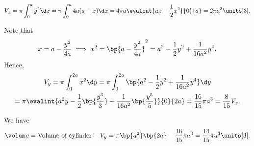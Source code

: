 \begin{solution}
    \[V_x = \pi \int_0^a y^2 \d x = \pi \int_0^a 4a(a-x) \d x = 4\pi a \evalint{ax - \frac12 x^2}{0}{a} = 2\pi a^3 \units[3].\]
    
    Note that \[x = a-\frac{y^2}{4a} \implies x^2 = \bp{a - \frac{y^2}{4a}}^2 = a^2 - \frac12 y^2 + \frac1{16a^2}y^4.\] Hence, 
    \begin{gather*}
        V_y = \pi \int_0^{2a} x^2 \d y = \pi \int_0^{2a} \bp{a^2 - \frac12 y^2 + \frac1{16a^2}y^4} \d y\\
        = \pi \evalint{a^2y - \frac12 \bp{\frac{y^3}3} + \frac1{16a^2}\bp{\frac{y^5}5}}{0}{2a} = \frac{16}{15} \pi a^3 = \frac8{15} V_x.
    \end{gather*}

    We have \[\volume = \text{Volume of cylinder} - V_y = \pi\bp{a^2}\bp{2a} - \frac{16}{15} \pi a^3 = \frac{14}{15} \pi a^3 \units[3].\]
\end{solution}

